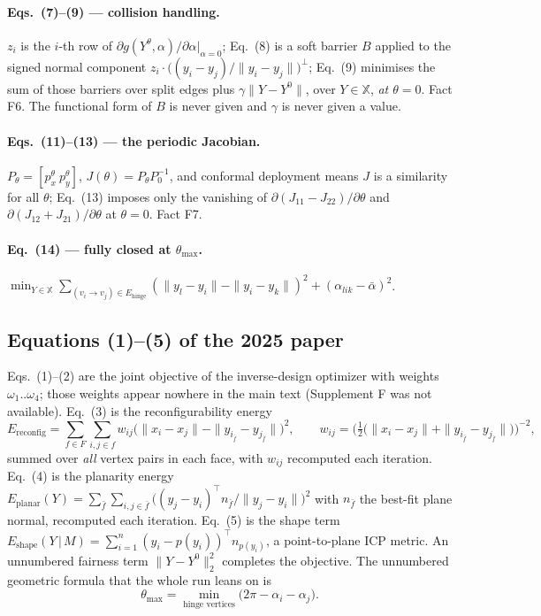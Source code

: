\documentclass[10pt,a4paper]{article}
\begin{document}
\paragraph{Eqs.~(7)--(9) --- collision handling.}
$z_i$ is the $i$-th row of $\partial g(Y^\theta,\alpha)/\partial\alpha|_{\alpha=0}$; Eq.~(8) is a
soft barrier $B$ applied to the signed normal component
$z_i\cdot\big((y_i-y_j)/\|y_i-y_j\|\big)^{\!\perp}$; Eq.~(9) minimises the sum of those barriers
over split edges plus $\gamma\|Y-Y^0\|$, over $Y\in\mathbb X$, \emph{at $\theta=0$}. Fact F6.
The functional form of $B$ is never given and $\gamma$ is never given a value.

\paragraph{Eqs.~(11)--(13) --- the periodic Jacobian.}
$P_\theta = [p_x^\theta\ p_y^\theta]$, $J(\theta) = P_\theta P_0^{-1}$, and conformal deployment
means $J$ is a similarity for all $\theta$; Eq.~(13) imposes only the vanishing of
$\partial(J_{11}-J_{22})/\partial\theta$ and $\partial(J_{12}+J_{21})/\partial\theta$ at
$\theta=0$. Fact F7.

\paragraph{Eq.~(14) --- fully closed at $\theta_{\max}$.}
$\min_{Y\in\mathbb X}\sum_{(v_i\to v_j)\in E_{\mathrm{hinge}}}
(\|y_l-y_i\|-\|y_i-y_k\|)^2 + (\alpha_{lik}-\bar\alpha)^2$.

\subsection{Equations (1)--(5) of the 2025 paper}

Eqs.~(1)--(2) are the joint objective of the inverse-design optimizer with weights
$\omega_1..\omega_4$; those weights appear nowhere in the main text (Supplement F was not
available). Eq.~(3) is the reconfigurability energy
\[
E_{\mathrm{reconfig}} = \sum_{f\in F}\sum_{i,j\in f} w_{ij}\big(\|x_i-x_j\| - \|y_{i_{\bar f}}-y_{j_{\bar f}}\|\big)^2 ,
\qquad
w_{ij} = \Big(\tfrac12\big(\|x_i-x_j\| + \|y_{i_{\bar f}}-y_{j_{\bar f}}\|\big)\Big)^{-2},
\]
summed over \emph{all} vertex pairs in each face, with $w_{ij}$ recomputed each iteration.
Eq.~(4) is the planarity energy
$E_{\mathrm{planar}}(Y)=\sum_{\bar f}\sum_{i,j\in\bar f}\big((y_j-y_i)^{\!\top} n_{\bar f}/\|y_j-y_i\|\big)^2$
with $n_{\bar f}$ the best-fit plane normal, recomputed each iteration. Eq.~(5) is the shape
term
$E_{\mathrm{shape}}(Y\,|\,M)=\sum_{i=1}^{n}(y_i-p(y_i))^{\!\top} n_{p(y_i)}$, a point-to-plane
ICP metric. An unnumbered fairness term $\|Y-Y^0\|_2^2$ completes the objective. The unnumbered
geometric formula that the whole run leans on is
\[
\theta_{\max} = \min_{\text{hinge vertices}} \big(2\pi - \alpha_i - \alpha_j\big).
\]
\end{document}
